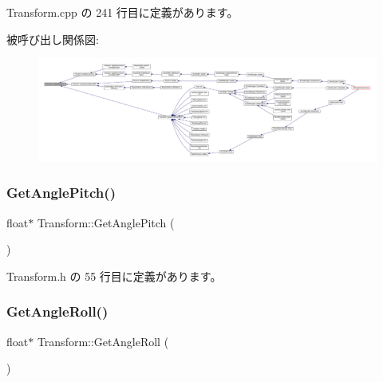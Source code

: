 Transform.\+cpp の 241 行目に定義があります。

被呼び出し関係図\+:
\nopagebreak
\begin{figure}[H]
\begin{center}
\leavevmode
\includegraphics[width=350pt]{class_transform_a7884cb828ace5c921e7138d83c43d689_icgraph}
\end{center}
\end{figure}
\mbox{\label{class_transform_a8c4966ea0a5d6cafa79c430e31bf0dff}} 
\subsubsection{\texorpdfstring{Get\+Angle\+Pitch()}{GetAnglePitch()}}
{\footnotesize\ttfamily float$\ast$ Transform\+::\+Get\+Angle\+Pitch (\begin{DoxyParamCaption}{ }\end{DoxyParamCaption})\hspace{0.3cm}{\ttfamily [inline]}}



 Transform.\+h の 55 行目に定義があります。

\mbox{\label{class_transform_a124d6afb5dd0a86952c99f1cec72e394}} 
\subsubsection{\texorpdfstring{Get\+Angle\+Roll()}{GetAngleRoll()}}
{\footnotesize\ttfamily float$\ast$ Transform\+::\+Get\+Angle\+Roll (\begin{DoxyParamCaption}{ }\end{DoxyParamCaption})\hspace{0.3cm}{\ttfamily [inline]}}



